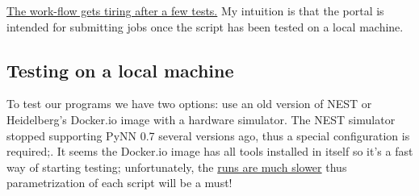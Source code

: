 \documentclass[11pt,a4paper]{article}
\begin{document}
  \underline{The work-flow gets tiring after a few tests.} 
  My intuition is that the portal is intended for submitting jobs once the script has been tested on a local machine. 
 
  \subsection{Testing on a local machine}
  To test our programs we have two options: use an old version of NEST or Heidelberg's Docker.io image with a hardware simulator.
  The NEST simulator stopped supporting PyNN 0.7 several versions ago, thus a special configuration is required;.
  It seems the Docker.io image has all tools installed in itself so it's a fast way of starting testing; unfortunately, the \underline{runs are much slower} thus parametrization of each script will be a must!
 
 
 
 
\end{document}
